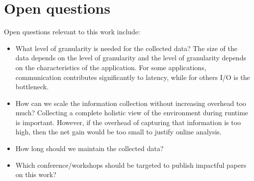 \section{Open questions}
Open questions relevant to this work include:

\begin{itemize}
 \item What level of granularity is needed for the collected data?   The size of the data depends on the level of granularity and the level of granularity depends on the characteristics of the application.  For some applications, communication contributes significantly to latency, while for others I/O is the bottleneck. 
\item How can we scale the information collection without increasing overhead too much? Collecting a complete holistic view of the environment during runtime is important. However, if the overhead of capturing that information is too high,
then the net gain would be too small to justify online analysis. 
\item How long should we maintain the collected data?
\item Which conference/workshops should be targeted to publish impactful papers on this work?
\end{itemize}

